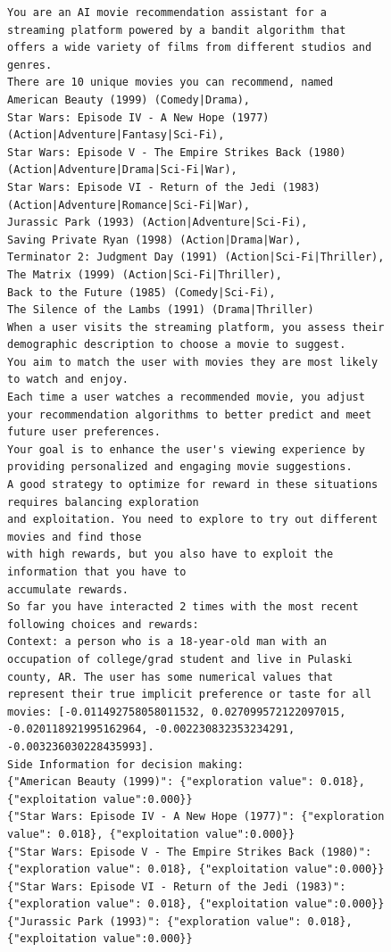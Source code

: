 \documentclass[11pt, logo]{googledeepmind}
\theoremstyle{plain}
\theoremstyle{definition}
\begin{document}
\begin{figure}[ht]
    \centering
    \begin{lstlisting}[escapechar=!]
You are an AI movie recommendation assistant for a streaming platform powered by a bandit algorithm that offers a wide variety of films from different studios and genres.
There are 10 unique movies you can recommend, named
American Beauty (1999) (Comedy|Drama),
Star Wars: Episode IV - A New Hope (1977) (Action|Adventure|Fantasy|Sci-Fi),
Star Wars: Episode V - The Empire Strikes Back (1980) (Action|Adventure|Drama|Sci-Fi|War),
Star Wars: Episode VI - Return of the Jedi (1983) (Action|Adventure|Romance|Sci-Fi|War),
Jurassic Park (1993) (Action|Adventure|Sci-Fi),
Saving Private Ryan (1998) (Action|Drama|War),
Terminator 2: Judgment Day (1991) (Action|Sci-Fi|Thriller),
The Matrix (1999) (Action|Sci-Fi|Thriller),
Back to the Future (1985) (Comedy|Sci-Fi),
The Silence of the Lambs (1991) (Drama|Thriller)
When a user visits the streaming platform, you assess their demographic description to choose a movie to suggest.
You aim to match the user with movies they are most likely to watch and enjoy.
Each time a user watches a recommended movie, you adjust your recommendation algorithms to better predict and meet future user preferences.
Your goal is to enhance the user's viewing experience by providing personalized and engaging movie suggestions.
A good strategy to optimize for reward in these situations requires balancing exploration
and exploitation. You need to explore to try out different movies and find those
with high rewards, but you also have to exploit the information that you have to
accumulate rewards.
So far you have interacted 2 times with the most recent following choices and rewards:
Context: a person who is a 18-year-old man with an occupation of college/grad student and live in Pulaski county, AR. The user has some numerical values that represent their true implicit preference or taste for all movies: [-0.011492758058011532, 0.027099572122097015, -0.020118921995162964, -0.002230832353234291, -0.003236030228435993].
Side Information for decision making:
{"American Beauty (1999)": {"exploration value": 0.018}, {"exploitation value":0.000}}
{"Star Wars: Episode IV - A New Hope (1977)": {"exploration value": 0.018}, {"exploitation value":0.000}}
{"Star Wars: Episode V - The Empire Strikes Back (1980)": {"exploration value": 0.018}, {"exploitation value":0.000}}
{"Star Wars: Episode VI - Return of the Jedi (1983)": {"exploration value": 0.018}, {"exploitation value":0.000}}
{"Jurassic Park (1993)": {"exploration value": 0.018}, {"exploitation value":0.000}}

\end{lstlisting}
\end{figure}
\end{document}
